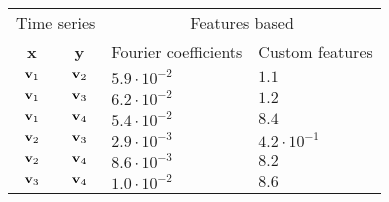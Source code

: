 \begin{tabular}{ccll}
    \toprule
    \multicolumn{2}{c}{Time series} & \multicolumn{2}{c}{Features based} \\
    \textbf{x} & \textbf{y} & Fourier coefficients & Custom features \\ \otoprule
    $\textbf{v}_{1}$ & $\textbf{v}_{2}$ & $5.9 \cdot 10^{-2}$ & $1.1$ \\
    $\textbf{v}_{1}$ & $\textbf{v}_{3}$ & $6.2 \cdot 10^{-2}$ & $1.2$ \\
    $\textbf{v}_{1}$ & $\textbf{v}_{4}$ & $5.4 \cdot 10^{-2}$ & $8.4$ \\
    $\textbf{v}_{2}$ & $\textbf{v}_{3}$ & $2.9 \cdot 10^{-3}$ & $4.2 \cdot 10^{-1}$ \\
    $\textbf{v}_{2}$ & $\textbf{v}_{4}$ & $8.6 \cdot 10^{-3}$ & $8.2$ \\
    $\textbf{v}_{3}$ & $\textbf{v}_{4}$ & $1.0 \cdot 10^{-2}$ & $8.6$ \\
    \bottomrule
\end{tabular}
